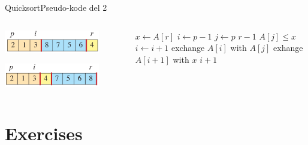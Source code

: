 \documentclass[aspectratio=1610]{beamer}
\begin{document}
\begin{frame}{Quicksort}{Pseudo-kode del 2}
\begin{columns}
\begin{overprint}
            \centerline{\includegraphics[width=0.8\textwidth]{quicksort/example-h}}
            \centerline{\includegraphics[width=0.8\textwidth]{quicksort/example-i}}
        \end{overprint}


        \begin{minipage}{\textwidth}
            \centering
            \begin{tcolorbox}

                \vspace{-\abovedisplayskip}
                \begin{codebox}
                    \li $x \gets A[r]$
                    \li $i \gets p-1$
                    \li \For $j \gets p$ \To $r-1$
                        \Do
                    \li     \If $A[j] \leq x$ \Then
                    \li         $i \gets i + 1$
                    \li         exchange $A[i]$ with $A[j]$
                            \End
                        \End
                    \li exhange $A[i+1]$ with $x$
                    \li \Return $i+1$
                \end{codebox}
            \end{tcolorbox}
        \end{minipage}
        
    \end{columns}
\end{frame}



\section{Exercises}
\end{document}
